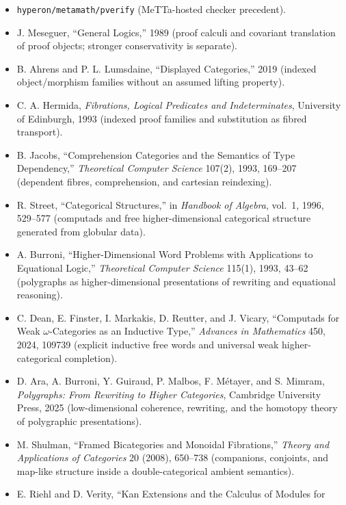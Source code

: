 \documentclass[11pt]{article}
\newcommand{\MeTTa}{MeTTa}
\newcommand{\code}[1]{\texttt{#1}}
\begin{document}
\begin{itemize}
  the proof-relevant substitution-stable semantic universe together with
  extensional uniqueness of semantic meanings under conversion, the simultaneous
  fundamental lemma, and strong normalization of every fully regular judgment).
\item \code{hyperon/metamath/pverify} (\MeTTa-hosted checker precedent).
\item J. Meseguer, ``General Logics,'' 1989 (proof calculi and covariant
  translation of proof objects; stronger conservativity is separate).
\item B. Ahrens and P. L. Lumsdaine, ``Displayed Categories,'' 2019
  (indexed object/morphism families without an assumed lifting property).
\item C. A. Hermida, \emph{Fibrations, Logical Predicates and
  Indeterminates}, University of Edinburgh, 1993
  (indexed proof families and substitution as fibred transport).
\item B. Jacobs, ``Comprehension Categories and the Semantics of Type
  Dependency,'' \emph{Theoretical Computer Science} 107(2), 1993,
  169--207 (dependent fibres, comprehension, and cartesian reindexing).
\item R. Street, ``Categorical Structures,'' in \emph{Handbook of Algebra},
  vol.~1, 1996, 529--577 (computads and free higher-dimensional categorical
  structure generated from globular data).
\item A. Burroni, ``Higher-Dimensional Word Problems with Applications to
  Equational Logic,'' \emph{Theoretical Computer Science} 115(1), 1993,
  43--62 (polygraphs as higher-dimensional presentations of rewriting and
  equational reasoning).
\item C. Dean, E. Finster, I. Markakis, D. Reutter, and J. Vicary,
  ``Computads for Weak $\omega$-Categories as an Inductive Type,''
  \emph{Advances in Mathematics} 450, 2024, 109739 (explicit inductive free
  words and universal weak higher-categorical completion).
\item D. Ara, A. Burroni, Y. Guiraud, P. Malbos, F. M\'etayer, and S. Mimram,
  \emph{Polygraphs: From Rewriting to Higher Categories}, Cambridge
  University Press, 2025 (low-dimensional coherence, rewriting, and the
  homotopy theory of polygraphic presentations).
\item M. Shulman, ``Framed Bicategories and Monoidal Fibrations,''
  \emph{Theory and Applications of Categories} 20 (2008), 650--738
  (companions, conjoints, and map-like structure inside a double-categorical
  ambient semantics).
\item E. Riehl and D. Verity, ``Kan Extensions and the Calculus of Modules for

\end{itemize}
\end{document}
